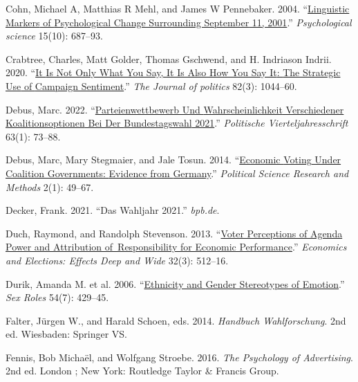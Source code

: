 \documentclass[a4paper,11pt]{article}
\newlength{\cslhangindent}
\newenvironment{CSLReferences}[2] %
 {\setlength{\cslhangindent}{#2\parindent}%
  \setlength{\parindent}{0pt}%
  \everypar{\setlength{\hangindent}{\cslhangindent}}\ignorespaces}
 {\par}
\begin{document}
\begin{CSLReferences}{1}{0}
\leavevmode{}%
Cohn, Michael A, Matthias R Mehl, and James W Pennebaker. 2004. {``\href{https://doi.org/10.1111/j.0956-7976.2004.00741.x}{Linguistic {Markers} of {Psychological Change Surrounding September} 11, 2001}.''} \emph{Psychological science} 15(10): 687--93.

\leavevmode{}%
Crabtree, Charles, Matt Golder, Thomas Gschwend, and H. Indriason Indrii. 2020. {``\href{https://doi.org/10.1086/707613}{It {Is Not Only What You Say}, {It Is Also How You Say It}: {The Strategic Use} of {Campaign Sentiment}}.''} \emph{The Journal of politics} 82(3): 1044--60.

\leavevmode{}%
Debus, Marc. 2022. {``\href{https://doi.org/10.1007/s11615-021-00361-8}{Parteienwettbewerb Und {Wahrscheinlichkeit} Verschiedener {Koalitionsoptionen} Bei Der {Bundestagswahl} 2021}.''} \emph{Politische Vierteljahresschrift} 63(1): 73--88.

\leavevmode{}%
Debus, Marc, Mary Stegmaier, and Jale Tosun. 2014. {``\href{https://doi.org/10.1017/psrm.2013.16}{Economic {Voting} Under {Coalition Governments}: {Evidence} from {Germany}}.''} \emph{Political Science Research and Methods} 2(1): 49--67.

\leavevmode{}%
Decker, Frank. 2021. {``{Das Wahljahr 2021}.''} \emph{bpb.de}.

\leavevmode{}%
Duch, Raymond, and Randolph Stevenson. 2013. {``\href{https://doi.org/10.1016/j.electstud.2013.05.013}{Voter Perceptions of Agenda Power and Attribution of~Responsibility for Economic Performance}.''} \emph{Economics and Elections: Effects Deep and Wide} 32(3): 512--16.

\leavevmode{}%
Durik, Amanda M. et al. 2006. {``\href{https://doi.org/10.1007/s11199-006-9020-4}{Ethnicity and {Gender Stereotypes} of {Emotion}}.''} \emph{Sex Roles} 54(7): 429--45.

\leavevmode{}%
Falter, Jürgen W., and Harald Schoen, eds. 2014. \emph{Handbuch {Wahlforschung}}. 2nd ed. {Wiesbaden}: {Springer VS}.

\leavevmode{}%
Fennis, Bob Michaël, and Wolfgang Stroebe. 2016. \emph{The Psychology of Advertising}. 2nd ed. {London ; New York}: {Routledge Taylor \& Francis Group}.


\end{CSLReferences}
\end{document}
